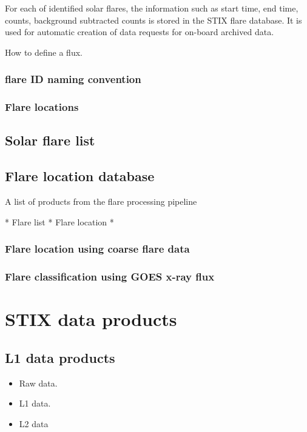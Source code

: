\documentclass{aa}
\begin{document}
For each of identified solar flares,   the  information such as start time, end time, counts, background subtracted counts is stored in the STIX flare database.   It is used for automatic creation of data requests for on-board archived data.

How to define a flux.


\subsubsection{flare ID naming convention}
\subsubsection{Flare locations}

\subsection{Solar flare list}
\subsection{Flare location database}


A list of products from the flare processing pipeline

* Flare list
* Flare location
*

\subsubsection{Flare location using coarse flare data}
\subsubsection{Flare classification using GOES x-ray flux}

\section{STIX data products}

\subsection{L1 data products}
\begin{itemize}
    \item Raw data.
    \item L1 data.
    \item L2 data
    
\end{itemize}
\end{document}
